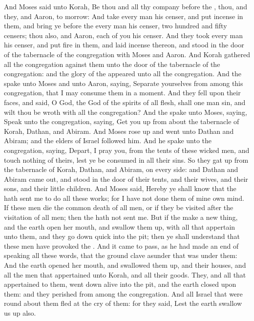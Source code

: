 \begin{biblechapter}
\verse And Moses said unto Korah, Be thou and all thy company before the \LORD, thou, and they, and Aaron, to morrow:
\verse And take every man his censer, and put incense in them, and bring ye before the \LORD every man his censer, two hundred and fifty censers; thou also, and Aaron, each of you his censer.
\verse And they took every man his censer, and put fire in them, and laid incense thereon, and stood in the door of the tabernacle of the congregation with Moses and Aaron.
\verse And Korah gathered all the congregation against them unto the door of the tabernacle of the congregation: and the glory of the \LORD appeared unto all the congregation.
\verse And the \LORD spake unto Moses and unto Aaron, saying,
\verse Separate yourselves from among this congregation, that I may consume them in a moment.
\verse And they fell upon their faces, and said, O God, the God of the spirits of all flesh, shall one man sin, and wilt thou be wroth with all the congregation?
\verse And the \LORD spake unto Moses, saying,
\verse Speak unto the congregation, saying, Get you up from about the tabernacle of Korah, Dathan, and Abiram.
\verse And Moses rose up and went unto Dathan and Abiram; and the elders of Israel followed him.
\verse And he spake unto the congregation, saying, Depart, I pray you, from the tents of these wicked men, and touch nothing of theirs, lest ye be consumed in all their sins.
\verse So they gat up from the tabernacle of Korah, Dathan, and Abiram, on every side: and Dathan and Abiram came out, and stood in the door of their tents, and their wives, and their sons, and their little children.
\verse And Moses said, Hereby ye shall know that the \LORD hath sent me to do all these works; for I have not done them of mine own mind.
\verse If these men die the common death of all men, or if they be visited after the visitation of all men; then the \LORD hath not sent me.
\verse But if the \LORD make a new thing, and the earth open her mouth, and swallow them up, with all that appertain unto them, and they go down quick into the pit; then ye shall understand that these men have provoked the \LORD.
\verse And it came to pass, as he had made an end of speaking all these words, that the ground clave asunder that was under them:
\verse And the earth opened her mouth, and swallowed them up, and their houses, and all the men that appertained unto Korah, and all their goods.
\verse They, and all that appertained to them, went down alive into the pit, and the earth closed upon them: and they perished from among the congregation.
\verse And all Israel that were round about them fled at the cry of them: for they said, Lest the earth swallow us up also.

\end{biblechapter}
